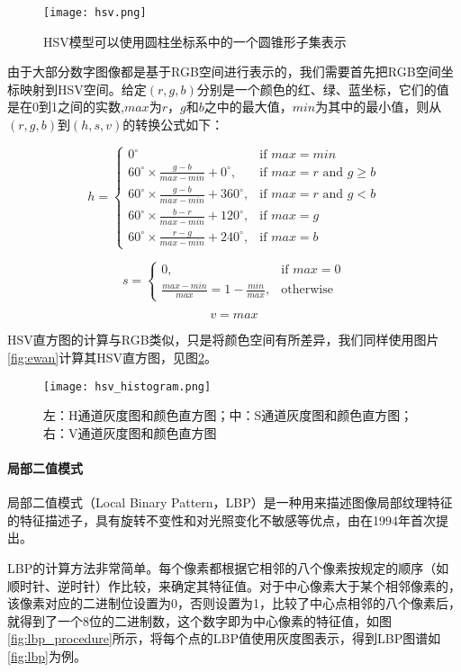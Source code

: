 \begin{figure}[htb]
  \centering
  \texttt{[image: hsv.png]}
  \caption{HSV模型可以使用圆柱坐标系中的一个圆锥形子集表示}
  \label{fig:hsv}
\end{figure}

  由于大部分数字图像都是基于RGB空间进行表示的，我们需要首先把RGB空间坐标映射到HSV空间。给定$(r,g,b)$分别是一个颜色的红、绿、蓝坐标，它们的值是在0到1之间的实数,$max$为$r$，$g$和$b$之中的最大值，$min$为其中的最小值，则从$(r,g,b)$到$(h,s,v)$的转换公式如下：\cite{foley1982fundamentals}

$$h={\begin{cases}0^{\circ }&{\mbox{if }}max=min\\60^{\circ }\times {\frac  {g-b}{max-min}}+0^{\circ },&{\mbox{if }}max=r{\mbox{ and }}g\geq b\\60^{\circ }\times {\frac  {g-b}{max-min}}+360^{\circ },&{\mbox{if }}max=r{\mbox{ and }}g<b\\60^{\circ }\times {\frac  {b-r}{max-min}}+120^{\circ },&{\mbox{if }}max=g\\60^{\circ }\times {\frac  {r-g}{max-min}}+240^{\circ },&{\mbox{if }}max=b\end{cases}}$$

$$s={\begin{cases}0,&{\mbox{if }}max=0\\{\frac  {max-min}{max}}=1-{\frac  {min}{max}},&{\mbox{otherwise}}\end{cases}}$$

$$
v=max
$$

  HSV直方图的计算与RGB类似，只是将颜色空间有所差异，我们同样使用图片\ref{fig:ewan}计算其HSV直方图，见图\ref{fig:hsvhistogram}。

\begin{figure}[htb]
  \centering
  \texttt{[image: hsv\_histogram.png]}
  \caption{左：H通道灰度图和颜色直方图；中：S通道灰度图和颜色直方图；右：V通道灰度图和颜色直方图}
  \label{fig:hsvhistogram}
\end{figure}

\paragraph{局部二值模式}

  局部二值模式（Local Binary Pattern，LBP）是一种用来描述图像局部纹理特征的特征描述子，具有旋转不变性和对光照变化不敏感等优点，由\citet{ojala1994performance}在1994年首次提出。

  LBP的计算方法非常简单。每个像素都根据它相邻的八个像素按规定的顺序（如顺时针、逆时针）作比较，来确定其特征值。对于中心像素大于某个相邻像素的，该像素对应的二进制位设置为0，否则设置为1，比较了中心点相邻的八个像素后，就得到了一个8位的二进制数，这个数字即为中心像素的特征值，如图\ref{fig:lbp_procedure}所示，将每个点的LBP值使用灰度图表示，得到LBP图谱如\ref{fig:lbp}为例。

